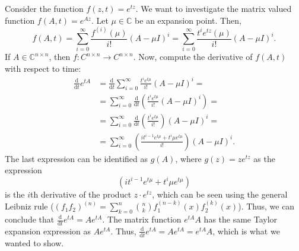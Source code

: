 Consider the function $f(z,t) = e^{tz}$. We want to investigate the matrix valued function $f(A,t) = e^{Az}$. Let $\mu \in \mathbb{C}$ be an expansion point. Then,
\begin{equation}
  f(A,t) = \sum\limits_{i = 0}^{\infty} \frac{f^{(i)}(\mu)}{i!}(A-\mu I)^{i} = \sum\limits_{i = 0}^{\infty} \frac{t^ie^{tz}(\mu)}{i!}(A-\mu I)^{i}.
\end{equation}
If $A\in\mathbb{C}^{n\times n}$, then $f:C^{n \times n}\rightarrow C^{n \times n}$. Now, compute the derivative of $f(A,t)$ with respect to time:
\begin{equation}
\begin{aligned}
\frac{\mathrm d}{\mathrm d t}e^{tA} & = \frac{\mathrm d}{\mathrm dt}\sum^{\infty}_{i = 0} \frac{t^ie^{t\mu}}{i!}(A-\mu I )^i = \\
& = \sum^{\infty}_{i = 0} \frac{\mathrm d}{\mathrm dt}\left(\frac{t^ie^{t\mu}}{i!}(A-\mu I )^i\right) = \\
& = \sum^{\infty}_{i = 0} \frac{\mathrm d}{\mathrm dt}\left(\frac{t^ie^{t\mu}}{i!}\right)(A-\mu I )^i  = \\
&= \sum^{\infty}_{i = 0}  \left(\frac{it^{i-1}e^{t\mu}+t^i\mu e^{t\mu}}{i!}\right) (A-\mu I )^i.
\end{aligned}
\end{equation}
The last expression can be identified as $g(A)$, where $g(z) = ze^{tz}$ as  the expression
\begin{equation}
\left(it^{i-1}e^{t\mu}+t^i\mu e^{t\mu}\right)
\end{equation}
is the $i$th derivative of the product $z\cdot e^{tz}$, which can be seen using the general Leibniz rule ($(f_1f_2)^{(n)} = \sum_{k = 0}^n\binom{n}{k}f_1^{(n-k)}(x)f_2^{(k)}(x)$). Thus, we can conclude that $\frac{\mathrm d }{\mathrm dt}e^{tA} = Ae^{tA}$. The matrix function $e^{tA}A$ has the same Taylor expansion expression as $Ae^{tA}$. Thus, $\frac{\mathrm d }{\mathrm dt}e^{tA} = Ae^{tA} = e^{tA} A$, which is what we wanted to show.




